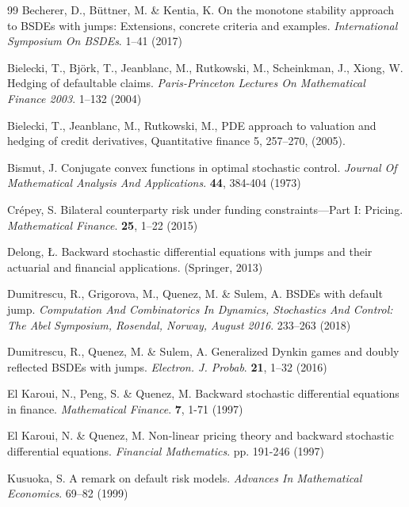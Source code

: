 \documentclass[11pt,a4paper]{article}
\numberwithin{equation}{section}
\theoremstyle{newPlain}
\theoremstyle{newDefinition}
\theoremstyle{newRemark}
\begin{document}
%
\begin{thebibliography}{99}
Becherer, D., Büttner, M. \& Kentia, K. On the monotone stability approach to BSDEs with jumps: Extensions, concrete criteria and examples. {\em International Symposium On BSDEs}. 1–41 (2017)

Bielecki, T., Björk, T., Jeanblanc, M., Rutkowski, M., Scheinkman, J., Xiong, W. Hedging of defaultable claims. {\em Paris-Princeton Lectures On Mathematical Finance 2003}. 1–132 (2004)

 Bielecki, T., Jeanblanc, M., Rutkowski, M., PDE approach to valuation and hedging of credit derivatives,
Quantitative finance 5, 257–270, (2005).

Bismut, J. Conjugate convex functions in optimal stochastic control. {\em Journal Of Mathematical Analysis And Applications}. \textbf{44}, 384-404 (1973)

Crépey, S. Bilateral counterparty risk under funding constraints—Part I: Pricing. {\em Mathematical Finance}. \textbf{25}, 1–22 (2015)

Delong, Ł. Backward stochastic differential equations with jumps and their actuarial and financial applications. (Springer, 2013)

Dumitrescu, R., Grigorova, M., Quenez, M. \& Sulem, A. BSDEs with default jump. {\em Computation And Combinatorics In Dynamics, Stochastics And Control: The Abel Symposium, Rosendal, Norway, August 2016}. 233–263 (2018)

Dumitrescu, R., Quenez, M. \& Sulem, A. Generalized Dynkin games and doubly reflected BSDEs with jumps. {\em Electron. J. Probab}. \textbf{21}, 1–32 (2016)

El Karoui, N., Peng, S. \& Quenez, M. Backward stochastic differential equations in finance. {\em Mathematical Finance}. \textbf{7}, 1-71 (1997)

El Karoui, N. \& Quenez, M. Non-linear pricing theory and backward stochastic differential equations. {\em Financial Mathematics}. pp. 191-246 (1997)

Kusuoka, S. A remark on default risk models. {\em Advances In Mathematical Economics}. 69–82 (1999)



\end{thebibliography}
\end{document}
